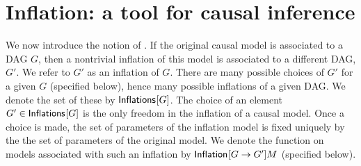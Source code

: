 

\section{Inflation: a tool for causal inference}

We now introduce the notion of .  %
If the original causal model is associated to a DAG $G$, then a nontrivial inflation of this model is associated to a different DAG, $G'$.  
We refer to $G'$ as an inflation of $G$.  There are many possible choices of $G'$ for a given $G$ (specified below), hence many possible inflations of a given DAG.  We denote the set of these by ${\operatorname{\mathsf{Inflations}}_{}}\lbrack G\rbrack$.   The choice of an element $G'\in {\operatorname{\mathsf{Inflations}}_{}}\lbrack G\rbrack$ is the only freedom in the inflation of a causal model.  Once a choice is made, the set of parameters of the inflation model is fixed uniquely by the the set of parameters of the original model.  We denote the function on models associated with such an inflation by ${\operatorname{\mathsf{Inflation}}_{}}\lbrack G\to G'\rbrack{M}$ (specified below).

